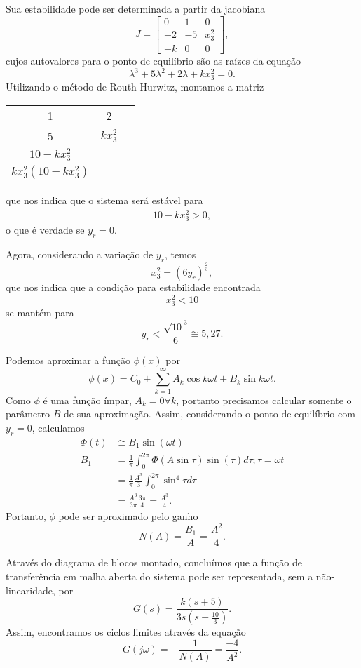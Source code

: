 \documentclass[a4paper]{report}
\begin{document}
Sua estabilidade pode ser determinada a partir da jacobiana \[
J = \begin{bmatrix} 
    0 & 1 & 0 \\
    -2 & -5 & x_3^2 \\
    -k & 0 & 0
\end{bmatrix} 
,\] cujos autovalores para o ponto de equilíbrio são as raízes da equação \[
\lambda^3 + 5\lambda^2 +2\lambda +kx_3^2 = 0
.\] Utilizando o método de Routh-Hurwitz, montamos a matriz
\begin{center}
\begin{tabular}{c c c}
    1 & 2 \\
    5 & $kx_3^2$ \\
    $10 -kx_3^2$ & \\
    $kx_3^2\left( 10-kx_3^2 \right) $
\end{tabular}
\end{center}
que nos indica que o sistema será estável para
\begin{align*}
    10 - kx_3^2 > 0
,\end{align*}
o que é verdade se $y_r = 0$.


Agora, considerando a variação de $y_r$, temos \[
x_3^2 = \left( 6y_r \right) ^{\frac{2}{3}}
,\] que nos indica que a condição para estabilidade encontrada \[
x_3^2<10
\] se mantém para \[
y_r < \frac{\sqrt{10}^3}{6} \cong 5,27
.\] 


Podemos aproximar a função $\phi(x)$ por \[
    \phi(x) = C_0 + \sum_{k=1}^{\infty} A_k\cos k\omega t + B_k \sin k\omega t
.\] Como $\phi$ é uma função ímpar, $A_k = 0 \forall k$, portanto precisamos calcular somente o parâmetro $B$ de sua aproximação. Assim, considerando o ponto de equilíbrio com $y_r = 0$, calculamos
\begin{align*}
    \Phi(t) &\cong B_1\sin\left( \omega t \right) \\
    B_1 &= \frac{1}{\pi}\int_0^{2\pi}\Phi\left( A\sin\tau \right) \sin\left( \tau\right) d\tau ; \tau = \omega t \\
	&= \frac{1}{\pi}\frac{A^3}{3}\int_0^{2\pi}\sin ^{4}\tau d\tau \\
	&= \frac{A^3}{3\pi}\frac{3\pi}{4} = \frac{A^3}{4}
.\end{align*}
Portanto, $\phi$ pode ser aproximado pelo ganho \[
    N(A) = \frac{B_1}{A} = \frac{A^2}{4}
.\] 

Através do diagrama de blocos montado, concluímos que a função de transferência em malha aberta do sistema pode ser representada, sem a não-linearidade, por \[
    G(s) = \frac{k\left( s+5 \right) }{3s\left( s + \frac{10}{3} \right) }
.\] Assim, encontramos os ciclos limites através da equação \[
G(j\omega) = -\frac{1}{N(A)} = \frac{-4}{A^2}
.\] 
\end{document}
